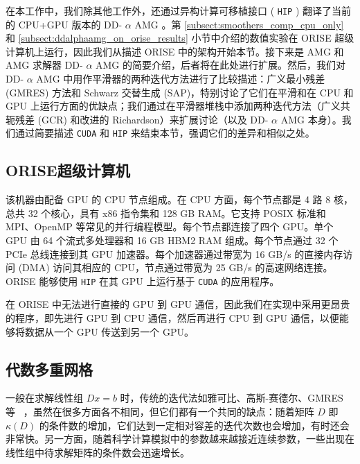 \documentclass[5p,times,a4paper,fleqn]{cas-dc}
\begin{document}
在本工作中，我们除其他工作外，还通过异构计算可移植接口 (   \texttt{HIP}   )    \cite{HIPdocum88:online,HIP_GitHub}    翻译了当前的 CPU+GPU 版本的 DD-   $\alpha$    AMG    \cite{wuppertalGPUDDalphaAMG}   。第    \ref{subsect:smoothers_comp_cpu_only}    和    \ref{subsect:ddalphaamg_on_orise_results}    小节中介绍的数值实验在 ORISE 超级计算机上运行，因此我们从描述 ORISE 中的架构开始本节。接下来是 AMG 和 AMG 求解器 DD-   $\alpha$    AMG 的简要介绍，后者将在此处进行扩展。然后，我们对 DD-   $\alpha$    AMG 中用作平滑器的两种迭代方法进行了比较描述：广义最小残差 (GMRES) 方法和 Schwarz 交替生成 (SAP)，特别讨论了它们在平滑和在 CPU 和 GPU 上运行方面的优缺点；我们通过在平滑器堆栈中添加两种迭代方法（广义共轭残差 (GCR) 和改进的 Richardson）来扩展讨论（以及 DD-   $\alpha$    AMG 本身）。我们通过简要描述    \texttt{CUDA}    和    \texttt{HIP}    来结束本节，强调它们的差异和相似之处。  

   \subsection{ORISE超级计算机  }     

该机器由配备 GPU 的 CPU 节点组成。在 CPU 方面，每个节点都是 4 路 8 核，总共 32 个核心，具有 x86 指令集和 128 GB RAM。它支持 POSIX 标准和 MPI、OpenMP 等常见的并行编程模型。每个节点都连接了四个 GPU。单个 GPU 由 64 个流式多处理器和 16 GB HBM2 RAM 组成。每个节点通过 32 个 PCIe 总线连接到其 GPU 加速器。每个加速器通过带宽为 16 GB/s 的直接内存访问 (DMA) 访问其相应的 CPU，节点通过带宽为 25 GB/s 的高速网络连接。ORISE 能够使用    \texttt{HIP}    在其 GPU 上运行基于    \texttt{CUDA}    的应用程序。  

在 ORISE 中无法进行直接的 GPU 到 GPU 通信，因此我们在实现中采用更昂贵的程序，即先进行 GPU 到 CPU 通信，然后再进行 CPU 到 GPU 通信，以便能够将数据从一个 GPU 传送到另一个 GPU。  

   \subsection{代数多重网格  }       \label{subsect:amg}     

一般在求解线性组    $Dx = b$    时，传统的迭代法如雅可比、高斯-赛德尔、GMRES 等~    \cite{saad2003iterative}    ，虽然在很多方面各不相同，但它们都有一个共同的缺点：随着矩阵    $D$    即 \     $\kappa(D)$    的条件数的增加，它们达到一定相对容差的迭代次数也会增加，有时还会非常快。另一方面，随着科学计算模拟中的参数越来越接近连续参数，一些出现在线性组中待求解矩阵的条件数会迅速增长。  
\end{document}
